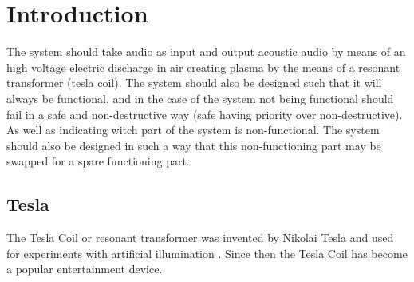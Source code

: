 \section{Introduction}
The system should take audio as input and output acoustic audio by means of an high voltage electric discharge in air creating plasma by the means of a resonant transformer (tesla coil). The system should also be designed such that it will always be functional, and in the case of the system not being functional should fail in a safe and non-destructive way (safe having priority over non-destructive). As well as indicating witch part of the system is non-functional. The system should also be designed in such a way that this non-functioning part may be swapped for a spare functioning part.

\subsection{Tesla}
The Tesla Coil or resonant transformer was invented by Nikolai Tesla and used for experiments with artificial illumination \citep{5570149}. Since then the Tesla Coil has become a popular entertainment device.